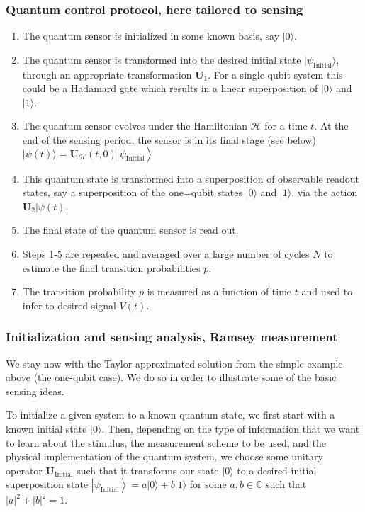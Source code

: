 \documentclass{beamer}
\begin{document}
\begin{frame}
\frametitle{Quantum control  protocol, here tailored to sensing}

\begin{block}{}
\begin{enumerate}
\item The quantum sensor is initialized in some known basis, say $\vert 0\rangle$.

\item The quantum sensor is transformed into the desired initial state $\vert \psi_{\mathrm{Initial}}\rangle$, through an appropriate transformation $\bm{U}_1$. For a single qubit system this could be a Hadamard gate which results in a linear superposition of $\vert 0\rangle$ and $\vert 1\rangle$.

\item The quantum sensor evolves under the Hamiltonian $\mathcal{H}$ for a time $t$. At the end of the sensing period, the sensor is in its final stage (see below) $\vert\psi(t)\rangle=\bm{U}_{\mathcal{H}}(t, 0)\left|\psi_{\mathrm{Initial}}\right\rangle$

\item This quantum state is transformed into a superposition of observable readout states, say a superposition of the one=qubit states $\vert 0\rangle$ and $\vert 1\rangle$, via the action $\bm{U}_2\vert \psi(t)$.

\item The final state of the quantum sensor is read out.

\item Steps 1-5 are repeated and averaged over a large number of cycles $N$ to estimate the final transition probabilities $p$.

\item The transition probability $p$ is measured as a function of time $t$ and used to infer to desired signal $V(t)$.
\end{enumerate}

\noindent
\end{block}
\end{frame}

\begin{frame}
\frametitle{Initialization and sensing analysis, Ramsey measurement}

We stay now with the Taylor-approximated solution from the simple
example above (the one-qubit case). We do so in order to illustrate
some of the basic sensing ideas.

To initialize a given system to a known quantum state, we first start
with a known initial state $|0\rangle$. Then, depending on the type of
information that we want to learn about the stimulus, the measurement
scheme to be used, and the physical implementation of the quantum
system, we choose some unitary operator $\bm{U}_{\mathrm{Initial}}$ such that
it transforms our state $|0\rangle$ to a desired initial superposition
state $\left|\psi_{\mathrm{Initial}}\right\rangle=a|0\rangle+b|1\rangle$
for some $a, b \in \mathbb{C}$ such that $|a|^{2}+|b|^{2}=1$.
\end{frame}
\end{document}
